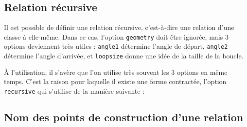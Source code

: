 \documentclass[a4paper,11pt]{report}
\newcommand{\inputTikZ}[1]{%
  }%
\newcommand{\inputTikZ}[1]{%
    \texttt{[image: fig/\#1.pdf]}%
  }%
\begin{document}
\medskip

\begin{minipage}{0.6\textwidth}

\end{minipage}
\begin{minipage}{0.4\textwidth}
\begin{center}
\inputTikZ{figure22}
\end{center}
\end{minipage}

\subsection{Relation récursive}

Il est possible de définir une relation récursive, c'est-à-dire une relation d'une classe à elle-même. Dans ce cas, l'option {\tt geometry} doit être ignorée, mais 3 options deviennent très utiles : {\tt angle1} détermine l'angle de départ, {\tt angle2} détermine l'angle d'arrivée, et {\tt loopsize} donne une idée de la taille de la boucle.

\medskip

\begin{minipage}{0.5\textwidth}

\end{minipage}
\begin{minipage}{0.4\textwidth}
\begin{center}
\inputTikZ{figure23}
\end{center}
\end{minipage}

\medskip

\`{A} l'utilisation, il s'avère que l'on utilise très souvent les 3 options en même temps. C'est la raison pour laquelle il existe une forme contractée, l'option {\tt recursive} qui s'utilise de la manière suivante :

\medskip

\begin{minipage}{0.5\textwidth}

\end{minipage}
\begin{minipage}{0.4\textwidth}
\begin{center}
\inputTikZ{figure24}
\end{center}
\end{minipage}

\subsection{Nom des points de construction d'une relation}
\end{document}
